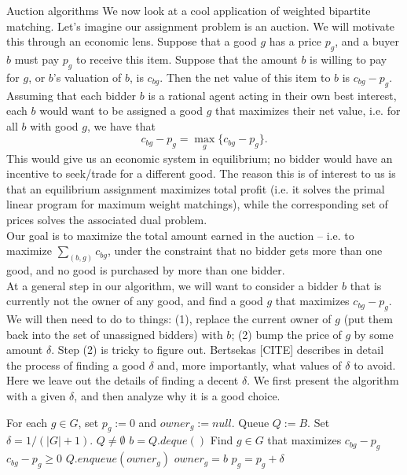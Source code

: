 \documentclass[11pt]{article}
\renewcommand{\'}{^{'}}
\renewcommand{\gets}{:=}
\begin{document}
\begin{section}{Auction algorithms}
	We now look at a cool application of weighted bipartite matching. Let's imagine our assignment 
	problem is an auction. We will motivate this through an economic lens. Suppose that a good $g$ 
	has a price $p_g$, and a buyer $b$ must pay $p_g$ to receive this item. Suppose that the 
	amount $b$ is willing to pay for $g$, or $b$'s valuation of $b$, is $c_{bg}$. Then the net value 
	of this item to $b$ is $c_{bg} - p_g$. Assuming that each bidder $b$ is a rational agent acting 
	in their own best interest, each $b$ would want to be assigned a good $g$ that maximizes their 
	net value, i.e. for all $b$ with good $g$, we have that 
	\[
		c_{bg} - p_g = \max_g \{c_{bg} - p_g \}.
	\]
	This would give us an economic system in equilibrium; no bidder would have an incentive to 
	seek/trade for a different good.
	The reason this is of interest to us is that an equilibrium assignment maximizes total 
	profit (i.e. it solves the primal linear program for maximum weight matchings), while the 
	corresponding set of prices solves the associated dual problem.\\
	Our goal is to maximize the total amount earned in the auction -- i.e. to 
	maximize $\sum_{(b,g)} c_{bg}$, under the constraint that no bidder gets more than one good, 
	and no good is purchased by more than one bidder. \\
	At a general step in our algorithm, we will want to consider a bidder $b$ that is currently 
	not the owner of any good, and find a good $g$ that maximizes $c_{bg} - p_g$. We will then need 
	to do to things: (1), replace the current owner of $g$ (put them back into the set of unassigned 
	bidders) with $b$; (2) bump the price of $g$ by some amount $\delta$. 
	Step (2) is tricky to figure out. Bertsekas [CITE] describes in detail the process of finding a 
	good $\delta$ and, more importantly, what values of $\delta$ to avoid. Here we leave out the 
	details of finding a decent $\delta$. We first present the algorithm with a given $\delta$, and 
	then analyze why it is a good choice.
	\singlespace
	\begin{codebox}
		\li For each $g\in G$, set $p_g \gets 0$ and $owner_g \gets null$.
		\li Queue $Q \gets B$.
		\li Set $\delta = 1/(|G| + 1)$.
		\li \While $Q\neq \emptyset$
			\Do
		\li		$b = Q.deque()$
		\li		Find $g\in G$ that maximizes $c_{bg} - p_{g}$
		\li		\If $c_{bg} - p_{g} \geq 0$
					\Then
		\li				$Q.enqueue(owner_g)$
		\li				$owner_g = b$
		\li				$p_g = p_g + \delta$

\end{codebox}
\end{section}
\end{document}

